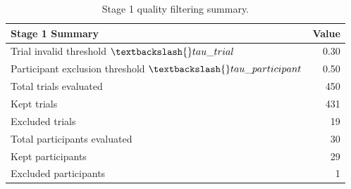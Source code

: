 \begin{table}[t]
\centering
\caption{Stage 1 quality filtering summary.}
\label{tab:stage1-quality}
\begin{tabular}{lr}
\hline
Stage 1 Summary & Value \\ \hline
Trial invalid threshold $\textbackslash{}tau\_{trial}$ & 0.30 \\ \hline
Participant exclusion threshold $\textbackslash{}tau\_{participant}$ & 0.50 \\ \hline
Total trials evaluated & 450 \\ \hline
Kept trials & 431 \\ \hline
Excluded trials & 19 \\ \hline
Total participants evaluated & 30 \\ \hline
Kept participants & 29 \\ \hline
Excluded participants & 1 \\ \hline
\end{tabular}
\end{table}
